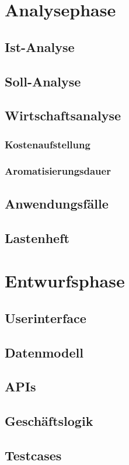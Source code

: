 \documentclass[12pt,oneside]{article}
\begin{document}
  \section{Analysephase}
  \subsection{Ist-Analyse}
  \subsection{Soll-Analyse}
  \subsection{Wirtschaftsanalyse}
  \subsubsection{Kostenaufstellung}
  \subsubsection{Aromatisierungsdauer}
  \subsection{Anwendungsfälle}
  \subsection{Lastenheft}
  \section{Entwurfsphase}
  \subsection{Userinterface}
  \subsection{Datenmodell}
  \subsection{APIs}
  \subsection{Geschäftslogik}
  \subsection{Testcases}
\end{document}
